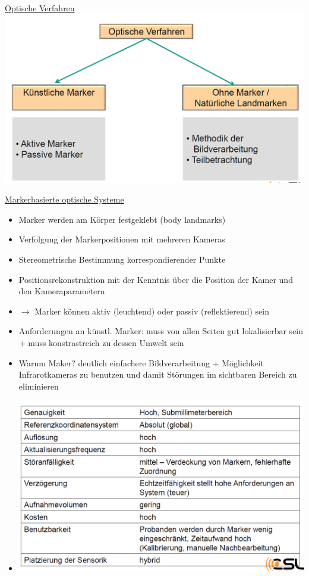 \documentclass[a4paper,10pt,oneside]{article}
\begin{document}
\underline{Optische Verfahren} \\
	\includegraphics[scale=0.2]{Grafiken/2227.png}
	
\underline{Markerbasierte optische Systeme} \\
	\begin{itemize}
		\item Marker werden am Körper festgeklebt (body landmarks)
		\item Verfolgung der Markerpositionen mit mehreren Kameras
		\item Stereometrische Bestimmung korrespondierender Punkte
		\item Positionsrekonstruktion mit der Kenntnis über die Position der Kamer und den Kameraparametern
		\item $\rightarrow$ Marker können aktiv (leuchtend) oder passiv (reflektierend) sein
		\item Anforderungen an künstl. Marker: muss von allen Seiten gut lokalisierbar sein + muss konstrastreich zu dessen Umwelt sein
		\item Warum Maker? deutlich einfachere Bildverarbeitung + Möglichkeit Infrarotkameras zu benutzen und damit Störungen im sichtbaren Bereich zu eliminieren
		\item[] \includegraphics[scale=0.2]{Grafiken/2230.png}
	\end{itemize}
	
\end{document}
